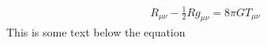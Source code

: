 
\begin{align*}
R_{\mu\nu} - \frac{1}{2} Rg_{\mu\nu} = 8\pi GT_{\mu\nu}
\end{align*}
This is some text below the equation

